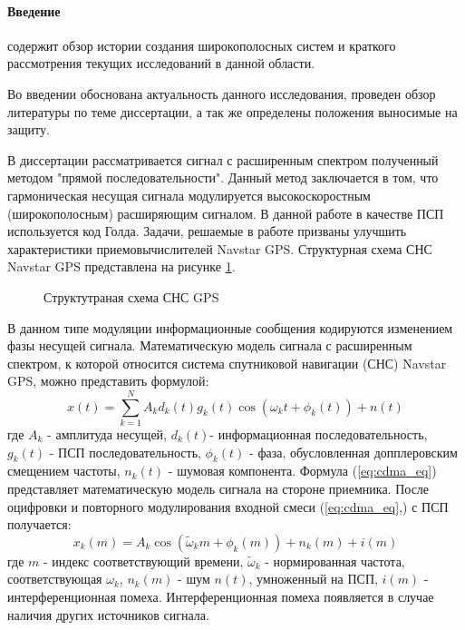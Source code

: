 \paragraph{Введение} содержит обзор истории создания широкополосных систем и краткого рассмотрения текущих исследований в данной области.

Во введении обоснована актуальность данного исследования, проведен обзор литературы по теме диссертации, а так же
определены положения выносимые на защиту.

В диссертации рассматривается сигнал с расширенным спектром полученный методом "прямой последовательности".
Данный метод заключается в том, что гармоническая несущая сигнала модулируется высокоскоростным (широкополосным)
расширяющим сигналом. В данной работе в качестве ПСП используется код Голда. Задачи, решаемые в работе призваны
улучшить характеристики приемовычислителей Navstar GPS. Структурная схема СНС Navstar GPS представлена на рисунке
\ref{pic:sec1_gnss_system}.

\begin{figure}[H]
	\center{}
	\caption{Структутраная схема СНС GPS}
	\label{pic:sec1_gnss_system}
\end{figure}

В данном типе модуляции информационные сообщения кодируются изменением фазы несущей сигнала.
Математическую модель сигнала с расширенным спектром, к которой относится система спутниковой навигации (СНС) Navstar GPS, можно представить формулой:
\begin{equation}
	\label{eq:cdma_eq}
	x(t)=\sum\limits_{k=1}^{N}A_k d_k(t)g_k(t)\cos{(\omega_{k}t + \phi_k(t))} + n(t)
\end{equation}
где ${A_k}$ - амплитуда несущей, ${d_k}(t)$- информационная последовательность, ${g_k}(t)$ - ПСП последовательность, ${\phi_k(t)}$ - фаза, обусловленная допплеровским смещением частоты, 
${n_k(t)}$ - шумовая компонента. Формула (\ref{eq:cdma_eq}) представляет математическую модель сигнала на стороне приемника.
После оцифровки и повторного модулирования входной смеси (\ref{eq:cdma_eq},) с ПСП получается:
\begin{equation}
	\label{eq:cdma_strip_eq}
	x_k(m) = A_k \cos{(\tilde{\omega}_{k}m + \phi_k(m))} + n_k(m) + i(m)
\end{equation}
где ${m}$ - индекс соответствующий времени, ${\tilde{\omega}_k}$ - нормированная частота, соответствующая ${\omega_k}$, ${n_k}(m)$ - шум ${n(t)}$, умноженный на ПСП,
${i(m)}$ - интерференционная помеха. Интерференционная помеха появляется в случае наличия других источников сигнала.


